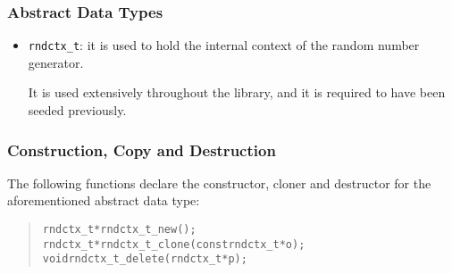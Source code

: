 \documentclass[a4paper]{article}
\newenvironment{code}%
{\begin{quote}\footnotesize\begin{alltt}}%
{\end{alltt}\end{quote}}%
\begin{document}
\subsubsection*{Abstract Data Types}
\begin{itemize}\small
\item \verb|rndctx_t|: it is used to hold the internal context of the
  random number generator. 

  It is used extensively throughout the library, and it is required to
  have been seeded previously.
\end{itemize}
\subsubsection*{Construction, Copy and Destruction}
The following functions declare the constructor, cloner and destructor
for the aforementioned abstract data type:
\begin{code}
rndctx_t* rndctx_t_new();
rndctx_t* rndctx_t_clone(const rndctx_t* o);
void rndctx_t_delete(rndctx_t* p);
\end{code}
\end{document}
